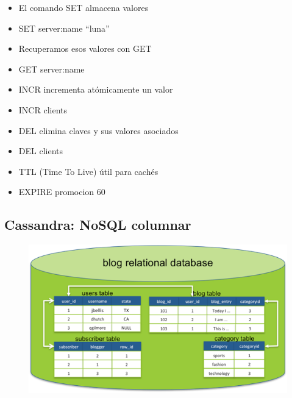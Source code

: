 \documentclass[]{book}
\providecommand{\tightlist}{%
  \setlength{\itemsep}{0pt}\setlength{\parskip}{0pt}}
\begin{document}
\begin{itemize}
\tightlist
\item
  El comando SET almacena valores
\item
  SET server:name ``luna''
\item
  Recuperamos esos valores con GET
\item
  GET server:name
\item
  INCR incrementa atómicamente un valor
\item
  INCR clients
\item
  DEL elimina claves y sus valores asociados
\item
  DEL clients
\item
  TTL (Time To Live) útil para cachés
\item
  EXPIRE promocion 60
\end{itemize}

\subsection{Cassandra: NoSQL columnar}\label{cassandra-nosql-columnar}

\begin{figure}
\centering
\includegraphics{images/BlogRDMS.png}
\caption{}
\end{figure}
\end{document}
